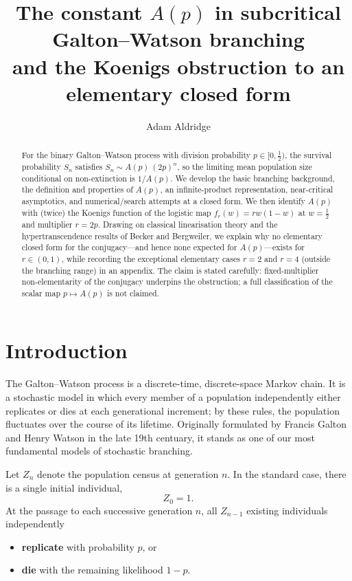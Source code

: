 \documentclass[11pt,a4paper]{article}
\title{\textbf{The constant $A(p)$ in subcritical Galton--Watson branching}\\[0.4em]
\large and the Koenigs obstruction to an elementary closed form}
\author{Adam Aldridge}
\date{}
\theoremstyle{plain}
\theoremstyle{definition}
\begin{document}
\maketitle

\begin{abstract}
\noindent
For the binary Galton--Watson process with division probability $p\in[0,\tfrac12)$, the survival probability $S_n$ satisfies $S_n\sim A(p)\,(2p)^n$, so the limiting mean population size conditional on non-extinction is $1/A(p)$. We develop the basic branching background, the definition and properties of $A(p)$, an infinite-product representation, near-critical asymptotics, and numerical/search attempts at a closed form. We then identify $A(p)$ with (twice) the Koenigs function of the logistic map $f_r(w)=rw(1-w)$ at $w=\tfrac12$ and multiplier $r=2p$. Drawing on classical linearisation theory and the hypertranscendence results of Becker and Bergweiler, we explain why no elementary closed form for the conjugacy---and hence none expected for $A(p)$---exists for $r\in(0,1)$, while recording the exceptional elementary cases $r=2$ and $r=4$ (outside the branching range) in an appendix. The claim is stated carefully: fixed-multiplier non-elementarity of the conjugacy underpins the obstruction; a full classification of the scalar map $p\mapsto A(p)$ is not claimed.
\end{abstract}

\tableofcontents
\clearpage

\section{Introduction}

The Galton--Watson process is a discrete-time, discrete-space Markov chain.
It is a stochastic model in which every member of a population independently
either replicates or dies at each generational increment; by these rules, the population
fluctuates over the course of its lifetime. Originally formulated by
Francis Galton and Henry Watson in the late 19th centuary, it stands as one of our most 
fundamental models of stochastic branching. 

Let $Z_n$ denote the population census at generation $n$.
In the standard case, there is a single initial individual,
\[
Z_0 = 1.
\]
At the passage to each successive generation $n$, all $Z_{n-1}$ existing individuals
independently

\begin{itemize}
    \item \textbf{replicate} with probability $p$, or
    \item \textbf{die} with the remaining
likelihood $1 - p$.
\end{itemize}
    
\end{document}
